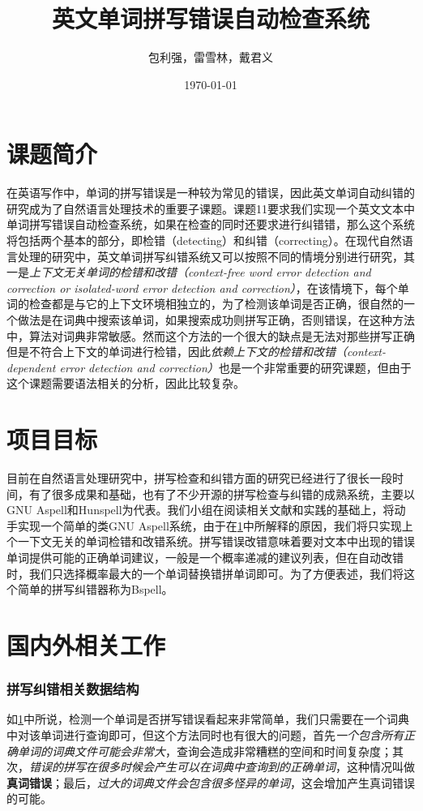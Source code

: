 \documentclass[UTF8,a4paper]{ctexart}
\title{英文单词拼写错误自动检查系统}
\author{包利强，雷雪林，戴君义}
\date{\today}
\begin{document}
\maketitle
\tableofcontents

\clearpage
\section{课题简介}
\label{intro}
在英语写作中，单词的拼写错误是一种较为常见的错误，因此英文单词自动纠错的研究成为了自然语言处理技术的重要子课题。课题11要求我们实现一个英文文本中单词拼写错误自动检查系统，如果在检查的同时还要求进行纠错错，那么这个系统将包括两个基本的部分，即检错（detecting）和纠错（correcting）。在现代自然语言处理的研究中，英文单词拼写纠错系统又可以按照不同的情境分别进行研究，其一是\textit{上下文无关单词的检错和改错（context-free word error detection and correction or isolated-word error detection and correction）}，在该情境下，每个单词的检查都是与它的上下文环境相独立的，为了检测该单词是否正确，很自然的一个做法是在词典中搜索该单词，如果搜索成功则拼写正确，否则错误，在这种方法中，算法对词典非常敏感。然而这个方法的一个很大的缺点是无法对那些拼写正确但是不符合上下文的单词进行检错，因此\textit{依赖上下文的检错和改错（context-dependent error detection and correction）}也是一个非常重要的研究课题，但由于这个课题需要语法相关的分析，因此比较复杂\cite{deorowicz2005correcting}。

\section{项目目标}
\label{target}
目前在自然语言处理研究中，拼写检查和纠错方面的研究已经进行了很长一段时间，有了很多成果和基础，也有了不少开源的拼写检查与纠错的成熟系统，主要以GNU Aspell和Hunspell为代表。我们小组在阅读相关文献和实践的基础上，将动手实现一个简单的类GNU Aspell\cite{atkinson2011gnu}系统，由于在\ref{intro}中所解释的原因，我们将只实现上个一下文无关的单词检错和改错系统。拼写错误改错意味着要对文本中出现的错误单词提供可能的正确单词建议，一般是一个概率递减的建议列表，但在自动改错时，我们只选择概率最大的一个单词替换错拼单词即可。为了方便表述，我们将这个简单的拼写纠错器称为Bspell。

\section{国内外相关工作}
\label{related}

\subsubsection{拼写纠错相关数据结构}
\label{detection}
如\ref{intro}中所说，检测一个单词是否拼写错误看起来非常简单，我们只需要在一个词典中对该单词进行查询即可，但这个方法同时也有很大的问题，首先\textit{一个包含所有正确单词的词典文件可能会非常大}，查询会造成非常糟糕的空间和时间复杂度；其次，\textit{错误的拼写在很多时候会产生可以在词典中查询到的正确单词}，这种情况叫做\textbf{真词错误}；最后，\textit{过大的词典文件会包含很多怪异的单词}，这会增加产生真词错误的可能。
\end{document}
